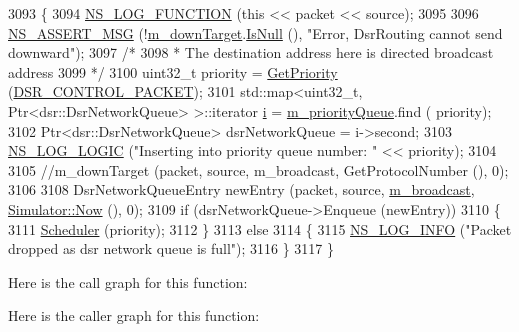 \begin{DoxyCode}
3093 \{
3094   \hyperlink{log-macros-disabled_8h_a90b90d5bad1f39cb1b64923ea94c0761}{NS\_LOG\_FUNCTION} (\textcolor{keyword}{this} << packet << source);
3095 
3096   \hyperlink{assert_8h_aff5ece9066c74e681e74999856f08539}{NS\_ASSERT\_MSG} (!\hyperlink{classns3_1_1dsr_1_1DsrRouting_aa1eb6ea60fdf9ba2cac2079a74ce1ca4}{m\_downTarget}.\hyperlink{classns3_1_1Callback_aa8e27826badbf37f84763f36f70d9b54}{IsNull} (), \textcolor{stringliteral}{"Error, DsrRouting cannot send
       downward"});
3097   \textcolor{comment}{/*}
3098 \textcolor{comment}{   * The destination address here is directed broadcast address}
3099 \textcolor{comment}{   */}
3100   uint32\_t priority = \hyperlink{classns3_1_1dsr_1_1DsrRouting_a67d111b0188b6e2210d1b4782820f8e3}{GetPriority} (\hyperlink{namespacens3_1_1dsr_a7c80bcec67d78dc149a0e503014d07c5abeaa53bf31d961c221e4e377ef6022f2}{DSR\_CONTROL\_PACKET});
3101   std::map<uint32\_t, Ptr<dsr::DsrNetworkQueue> >::iterator \hyperlink{bernuolliDistribution_8m_a6f6ccfcf58b31cb6412107d9d5281426}{i} = \hyperlink{classns3_1_1dsr_1_1DsrRouting_a4606c3dfb1099afbfe1e7cd1d1c3c8ee}{m\_priorityQueue}.find (
      priority);
3102   Ptr<dsr::DsrNetworkQueue> dsrNetworkQueue = i->second;
3103   \hyperlink{group__logging_ga88acd260151caf2db9c0fc84997f45ce}{NS\_LOG\_LOGIC} (\textcolor{stringliteral}{"Inserting into priority queue number: "} << priority);
3104 
3105   \textcolor{comment}{//m\_downTarget (packet, source, m\_broadcast, GetProtocolNumber (), 0);}
3106 
3108  DsrNetworkQueueEntry newEntry (packet, source, \hyperlink{classns3_1_1dsr_1_1DsrRouting_a52d4ef78c13236c73c60db85c0088ff6}{m\_broadcast}, 
      \hyperlink{classns3_1_1Simulator_ac3178fa975b419f7875e7105be122800}{Simulator::Now} (), 0);
3109  \textcolor{keywordflow}{if} (dsrNetworkQueue->Enqueue (newEntry))
3110    \{
3111      \hyperlink{classns3_1_1dsr_1_1DsrRouting_aa518edb174bccce1062304404424c6e0}{Scheduler} (priority);
3112    \}
3113  \textcolor{keywordflow}{else}
3114    \{
3115      \hyperlink{group__logging_gafbd73ee2cf9f26b319f49086d8e860fb}{NS\_LOG\_INFO} (\textcolor{stringliteral}{"Packet dropped as dsr network queue is full"});
3116    \}
3117 \}
\end{DoxyCode}


Here is the call graph for this function\+:




Here is the caller graph for this function\+:


